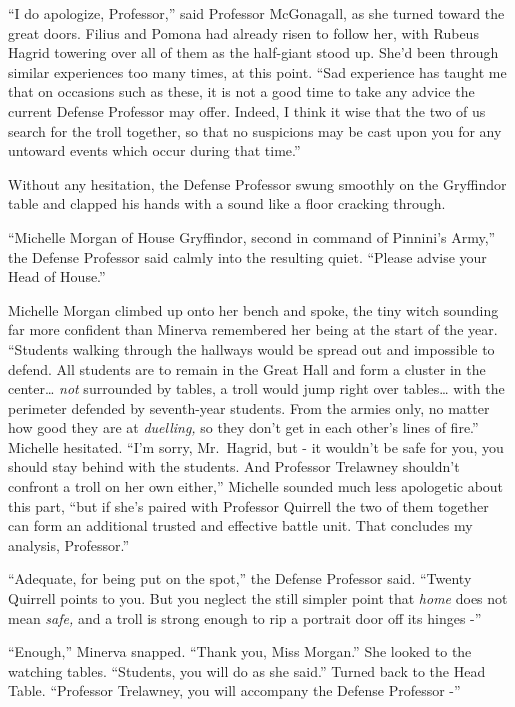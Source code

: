 ``I do apologize, Professor,'' said Professor McGonagall, as she turned
toward the great doors. Filius and Pomona had already risen to follow
her, with Rubeus Hagrid towering over all of them as the half-giant
stood up. She'd been through similar experiences too many times, at this
point. ``Sad experience has taught me that on occasions such as these,
it is not a good time to take any advice the current Defense Professor
may offer. Indeed, I think it wise that the two of us search for the
troll together, so that no suspicions may be cast upon you for any
untoward events which occur during that time.''

Without any hesitation, the Defense Professor swung smoothly on the
Gryffindor table and clapped his hands with a sound like a floor
cracking through.

``Michelle Morgan of House Gryffindor, second in command of Pinnini's
Army,'' the Defense Professor said calmly into the resulting quiet.
``Please advise your Head of House.''

Michelle Morgan climbed up onto her bench and spoke, the tiny witch
sounding far more confident than Minerva remembered her being at the
start of the year. ``Students walking through the hallways would be
spread out and impossible to defend. All students are to remain in the
Great Hall and form a cluster in the center\ldots{} \emph{not}
surrounded by tables, a troll would jump right over tables\ldots{} with
the perimeter defended by seventh-year students. From the armies only,
no matter how good they are at \emph{duelling,} so they don't get in
each other's lines of fire.'' Michelle hesitated. ``I'm sorry,
Mr.~Hagrid, but - it wouldn't be safe for you, you should stay behind
with the students. And Professor Trelawney shouldn't confront a troll on
her own either,'' Michelle sounded much less apologetic about this part,
``but if she's paired with Professor Quirrell the two of them together
can form an additional trusted and effective battle unit. That concludes
my analysis, Professor.''

``Adequate, for being put on the spot,'' the Defense Professor said.
``Twenty Quirrell points to you. But you neglect the still simpler point
that \emph{home} does not mean \emph{safe,} and a troll is strong enough
to rip a portrait door off its hinges -''

``Enough,'' Minerva snapped. ``Thank you, Miss Morgan.'' She looked to
the watching tables. ``Students, you will do as she said.'' Turned back
to the Head Table. ``Professor Trelawney, you will accompany the Defense
Professor -''

